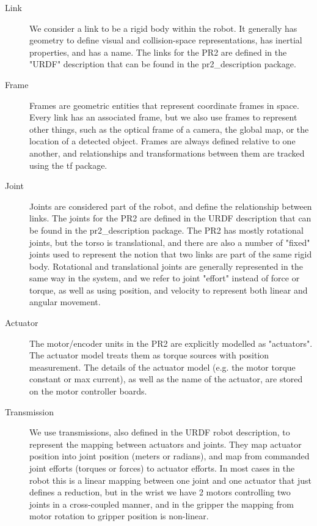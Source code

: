 \begin{description}
\item[Link] We consider a link to be a rigid body within the robot.  It generally has geometry to define visual and collision-space representations, has inertial properties, and has a name.  The links for the PR2 are defined in the "URDF" description that can be found in the pr2\_description package.
\item[Frame] Frames are geometric entities that represent coordinate frames in space.  Every link has an associated frame, but we also use frames to represent other things, such as the optical frame of a camera, the global map, or the location of a detected object.  Frames are always defined relative to one another, and relationships and transformations between them are tracked using the tf package.
\item[Joint] Joints are considered part of the robot, and define the relationship between links.  The joints for the PR2 are defined in the URDF description that can be found in the pr2\_description package.  The PR2 has mostly rotational joints, but the torso is translational, and there are also a number of "fixed" joints used to represent the notion that two links are part of the same rigid body.  Rotational and translational joints are generally represented in the same way in the system, and we refer to joint "effort" instead of force or torque, as well as using position, and velocity to represent both linear and angular movement.
\item[Actuator] The motor/encoder units in the PR2 are explicitly modelled as "actuators".  The actuator model treats them as torque sources with position measurement.  The details of the actuator model (e.g. the motor torque constant or max current), as well as the name of the actuator, are stored on the motor controller boards.
\item[Transmission] We use transmissions, also defined in the URDF robot description, to represent the mapping between actuators and joints.  They map actuator position into joint position (meters or radians), and map from commanded joint efforts (torques or forces) to actuator efforts.  In most cases in the robot this is a linear mapping between one joint and one actuator that just defines a reduction, but in the wrist we have 2 motors controlling two joints in a cross-coupled manner, and in the gripper the mapping from motor rotation to gripper position is non-linear.
\end{description}

